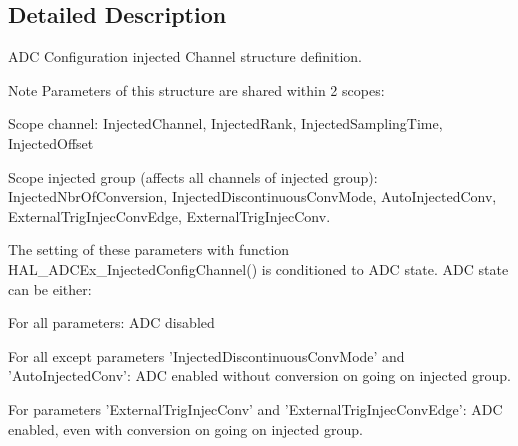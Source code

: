 \subsection{Detailed Description}
A\-D\-C Configuration injected Channel structure definition. 

\begin{DoxyNote}{Note}
Parameters of this structure are shared within 2 scopes\-:
\begin{DoxyItemize}
\item Scope channel\-: Injected\-Channel, Injected\-Rank, Injected\-Sampling\-Time, Injected\-Offset
\item Scope injected group (affects all channels of injected group)\-: Injected\-Nbr\-Of\-Conversion, Injected\-Discontinuous\-Conv\-Mode, Auto\-Injected\-Conv, External\-Trig\-Injec\-Conv\-Edge, External\-Trig\-Injec\-Conv. 
\end{DoxyItemize}

The setting of these parameters with function H\-A\-L\-\_\-\-A\-D\-C\-Ex\-\_\-\-Injected\-Config\-Channel() is conditioned to A\-D\-C state. A\-D\-C state can be either\-:
\begin{DoxyItemize}
\item For all parameters\-: A\-D\-C disabled
\item For all except parameters 'Injected\-Discontinuous\-Conv\-Mode' and 'Auto\-Injected\-Conv'\-: A\-D\-C enabled without conversion on going on injected group.
\item For parameters 'External\-Trig\-Injec\-Conv' and 'External\-Trig\-Injec\-Conv\-Edge'\-: A\-D\-C enabled, even with conversion on going on injected group. 
\end{DoxyItemize}
\end{DoxyNote}



